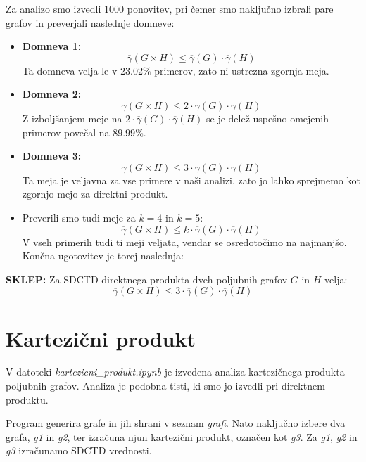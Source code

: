\documentclass[a4paper, 12pt]{article}
\begin{document}
\noindent Za analizo smo izvedli 1000 ponovitev, pri čemer smo naključno izbrali pare grafov in preverjali naslednje domneve:

\begin{itemize}
    \item \textbf{Domneva 1:} 
    \[
    \overline{\gamma}(G \times H) \leq \overline{\gamma}(G) \cdot \overline{\gamma}(H)
    \]
    Ta domneva velja le v \(23.02\%\) primerov, zato ni ustrezna zgornja meja.

    \item \textbf{Domneva 2:} 
    \[
    \overline{\gamma}(G \times H) \leq 2 \cdot \overline{\gamma}(G) \cdot \overline{\gamma}(H)
    \]
    Z izboljšanjem meje na \(2 \cdot \overline{\gamma}(G) \cdot \overline{\gamma}(H)\) se je delež uspešno omejenih primerov povečal na \(89.99\%\).

    \item \textbf{Domneva 3:} 
    \[
    \overline{\gamma}(G \times H) \leq 3 \cdot \overline{\gamma}(G) \cdot \overline{\gamma}(H)
    \]
    Ta meja je veljavna za vse primere v naši analizi, zato jo lahko sprejmemo kot zgornjo mejo za direktni produkt.

    \item Preverili smo tudi meje za \(k = 4\) in \(k = 5\): 
    \[
    \overline{\gamma}(G \times H) \leq k \cdot \overline{\gamma}(G) \cdot \overline{\gamma}(H)
    \]
    V vseh primerih tudi ti meji veljata, vendar se osredotočimo na najmanjšo. Končna ugotovitev je torej naslednja:
\end{itemize}


\noindent \textbf{SKLEP:} Za SDCTD direktnega produkta dveh poljubnih grafov  \(G\) in \(H\) velja:
\[
\overline{\gamma}(G \times H) \leq 3 \cdot \overline{\gamma}(G) \cdot \overline{\gamma}(H)
\]

\section*{Kartezični produkt}

V datoteki \textit{kartezicni\_produkt.ipynb} je izvedena analiza kartezičnega produkta poljubnih grafov. Analiza je podobna tisti, ki smo jo izvedli pri direktnem produktu.

\noindent Program generira grafe in jih shrani v seznam \textit{grafi}. Nato naključno izbere dva grafa, \textit{g1} in \textit{g2}, ter izračuna njun kartezični produkt, označen kot \textit{g3}. Za \textit{g1}, \textit{g2} in \textit{g3} izračunamo SDCTD vrednosti.
\end{document}

